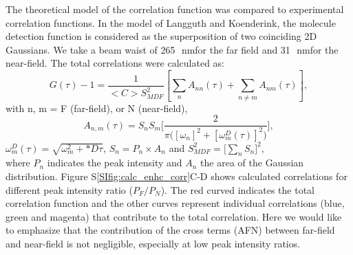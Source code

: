 \documentclass[11pt,a4paper,onecolumn]{article}
\newcommand{\nm}{\ensuremath{\,\textrm{nm}}}
\begin{document}
The theoretical model of the correlation function was compared to experimental correlation functions. In the model of Langguth and Koenderink\cite{langguth2016exact}, the molecule detection function is considered as the superposition of two coinciding 2D Gaussians. We take a beam waist of 265~\nm for the far field and 31~\nm for the near-field. The total correlations were calculated as:
\begin{equation}
	G(\tau)-1 = \frac{1}{<C>S_{MDF}^2}[\sum_{n}A_{nn}(\tau) + \sum_{n\neq m}A_{nm}(\tau)],
	\label{eq:far-near-gauss}
\end{equation}
with n, m = F (far-field), or N (near-field),
\begin{equation}
	A_{n,m}(\tau)=S_nS_m\Bigg[\frac{2}{\pi\Big([\omega_n]^2 + [\omega_m^D(\tau)]^2 \Big)}\Bigg] ,
	\label{eq:area-gauss}
\end{equation}
$\omega_m^D(\tau)=\sqrt{\omega_m^2 + *D\tau}$, $S_n=P_n\times A_n$ and $S_{MDF}^2=\Big[\sum_{n}S_n\Big]^2$,\\
where $P_n$ indicates the peak intensity and $A_n$ the area of the Gaussian distribution. Figure S\ref{SIfig:calc_enhc_corr}C-D shows calculated correlations for different peak intensity ratio ($P_F/P_N$). The red curved indicates the total correlation function and the other curves represent individual correlations (blue, green and magenta) that contribute to the total correlation. Here we would like to emphasize that the contribution of the cross terms (AFN) between far-field and near-field is not negligible, especially at low peak intensity ratios.
\end{document}
